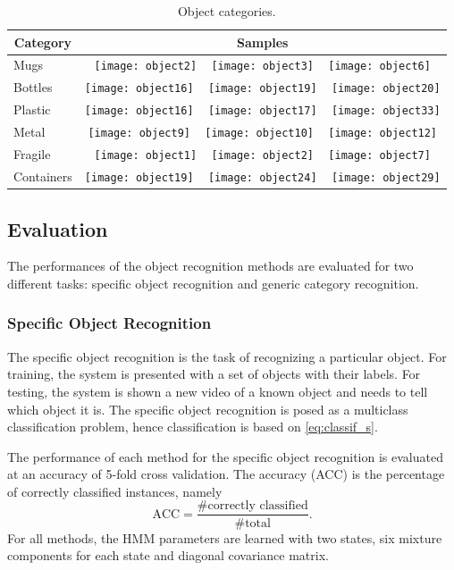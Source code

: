\documentclass[letterpaper, 10 pt, conference]{ieeeconf}
\begin{document}
\begin{table}
  \caption{Object categories.}
  \label{tab:ocat}
  \centering
  \begin{tabular}[t]{lc}
    \toprule
    \multicolumn{1}{c}{Category} & \multicolumn{1}{c}{Samples} \\ \midrule
    Mugs & \texttt{[image: object2]} ~ \texttt{[image: object3]} ~ \texttt{[image: object6]} \\
    Bottles & \texttt{[image: object16]} ~ \texttt{[image: object19]} ~ \texttt{[image: object20]} \\
    Plastic & \texttt{[image: object16]} ~ \texttt{[image: object17]} ~ \texttt{[image: object33]} \\
    Metal & \texttt{[image: object9]} ~ \texttt{[image: object10]} ~ \texttt{[image: object12]} \\
    Fragile & \texttt{[image: object1]} ~ \texttt{[image: object2]} ~ \texttt{[image: object7]} \\
    Containers & \texttt{[image: object19]} ~ \texttt{[image: object24]} ~ \texttt{[image: object29]} \\
    \bottomrule
  \end{tabular}
\end{table}

\subsection{Evaluation}
The performances of the object recognition methods are evaluated for two different tasks: specific object recognition and generic category recognition.

\subsubsection{Specific Object Recognition}
The specific object recognition is the task of recognizing a particular object. For training, the system is presented with a set of objects with their labels. For testing, the system is shown a new video of a known object and needs to tell which object it is. The specific object recognition is posed as a multiclass classification problem, hence classification is based on \cref{eq:classif_s}.

The performance of each method for the specific object recognition is evaluated at an accuracy of 5-fold cross validation. The accuracy (ACC) is the percentage of correctly classified instances, namely
\[ \text{ACC} =  \frac{\text{\# correctly classified}}{\text{\# total}} . \]
For all methods, the HMM parameters are learned with two states, six mixture components for each state and diagonal covariance matrix.
\end{document}
